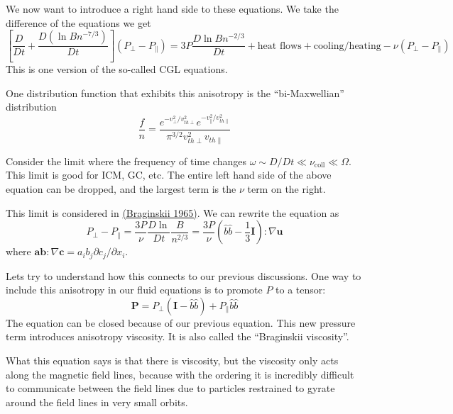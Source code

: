 \documentclass[letterpaper, 11pt]{article}
\numberwithin{equation}{section}
\numberwithin{figure}{section}
\begin{document}
We now want to introduce a right hand side to these equations. We take the
difference of the equations we get
\begin{equation}
  \label{eq:32}
  \left[ \frac{D}{Dt} + \frac{D(\ln B n^{-7/3})}{Dt} \right](P_{\perp} - P_{\parallel}) = 3P \frac{D\ln B n^{-2/3}}{Dt} + \text{heat flows} + \text{cooling/heating} - \nu(P_{\perp} - P_{\parallel})
\end{equation}
This is one version of the so-called CGL equations.

One distribution function that exhibits this anisotropy is the ``bi-Maxwellian''
distribution
\begin{equation}
  \label{eq:33}
  \frac{f}{n} = \frac{e^{-v_{\perp}^2/v_{th\perp}^2} e^{-v_{\parallel}^2/v_{th\parallel}^2}}{\pi^{3/2}v_{th\perp}^2v_{th\parallel}}
\end{equation}

Consider the limit where the frequency of time changes $\omega \sim D/Dt \ll
\nu_\mathrm{coll} \ll \Omega$. This limit is good for ICM, GC, etc. The entire
left hand side of the above equation can be dropped, and the largest term is the
$\nu$ term on the right.

This limit is considered in \href{http://adsabs.harvard.edu/abs/1965RvPP....1..205B}{(Braginskii 1965)}. We can rewrite the equation as
\begin{equation}
  \label{eq:34}
  P_{\perp} - P_{\parallel} = \frac{3P}{\nu}\frac{D \ln}{Dt}\frac{B}{n^{2/3}} = \frac{3P}{\nu}\left( \hat{b}\hat{b} - \frac{1}{3}\mathbf{I} \right):\nabla \mathbf{u}
\end{equation}
where $\mathbf{a}\mathbf{b}:\nabla \mathbf{c} = a_ib_j\partial c_j/\partial x_i$.

Lets try to understand how this connects to our previous discussions. One way to
include this anisotropy in our fluid equations is to promote $P$ to a tensor:
\begin{equation}
  \label{eq:35}
  \mathbf{P} = P_{\perp}\left( \mathbf{I} - \hat{b}\hat{b} \right) + P_{\parallel}\hat{b}\hat{b}
\end{equation}
The equation can be closed because of our previous equation. This new pressure
term introduces anisotropy viscosity. It is also called the ``Braginskii
viscosity''.

What this equation says is that there is viscosity, but the viscosity only acts
along the magnetic field lines, because with the ordering it is incredibly
difficult to communicate between the field lines due to particles restrained to
gyrate around the field lines in very small orbits.
\end{document}
